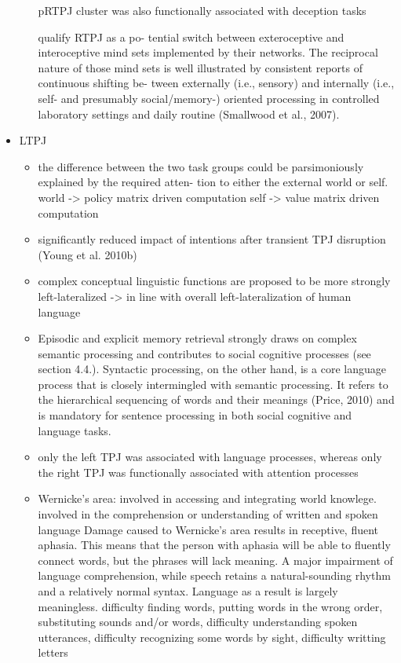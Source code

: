 \documentclass{article} %
\begin{document}
\begin{itemize}
\begin{itemize}
pRTPJ cluster was also functionally associated with deception tasks

qualify RTPJ as a po- tential switch between exteroceptive and interoceptive mind sets implemented by their networks. The reciprocal nature of those mind sets is well illustrated by consistent reports of continuous shifting be- tween externally (i.e., sensory) and internally (i.e., self- and presumably social/memory-) oriented processing in controlled laboratory settings and daily routine (Smallwood et al., 2007).
\end{itemize}



\item
  LTPJ
  \begin{itemize}
\item
the difference between the two task groups could be parsimoniously explained by the required atten- tion to either the external world or self.
world -> policy matrix driven computation
self -> value matrix driven computation

\item
significantly reduced impact of intentions after transient TPJ disruption (Young et al. 2010b)

\item
complex conceptual linguistic functions are proposed to be more strongly left-lateralized -> in line with overall left-lateralization of human language


\item
Episodic and explicit memory retrieval strongly draws on complex semantic processing and contributes to social cognitive processes (see section 4.4.). Syntactic processing, on the other hand, is a core language process that is closely intermingled with semantic processing. It refers to the hierarchical sequencing of words and their meanings (Price, 2010) and is mandatory for sentence processing in both social cognitive and language tasks.

\item
only the left TPJ was associated with language processes, whereas only the right TPJ was functionally associated with attention processes

\item 
Wernicke's area:
involved in accessing and integrating world knowlege.
involved in the comprehension or understanding of written and spoken language Damage caused to Wernicke's area results in receptive, fluent aphasia. This means that the person with aphasia will be able to fluently connect words, but the phrases will lack meaning.
A major impairment of language comprehension, while speech retains a natural-sounding rhythm and a relatively normal syntax. Language as a result is largely meaningless. difficulty finding words, putting words in the wrong order, substituting sounds and/or words, difficulty understanding spoken utterances, difficulty recognizing some words by sight, difficulty writting letters




\end{itemize}
\end{itemize}
\end{document}
